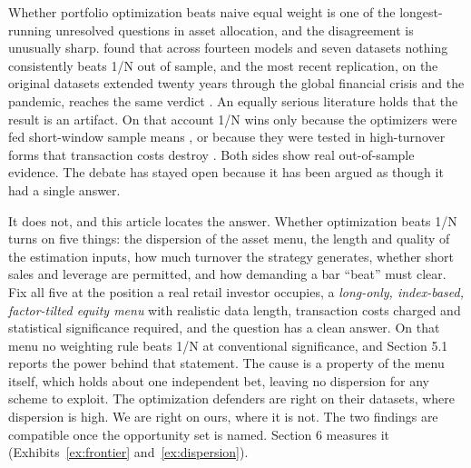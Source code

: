 \documentclass[12pt,letterpaper]{article}
\begin{document}
\clearpage


Whether portfolio optimization beats naive equal weight is one of the
longest-running unresolved questions in asset allocation, and the disagreement
is unusually sharp. \citet{demiguel2009} found that across fourteen models and
seven datasets nothing consistently beats 1/N out of sample, and the most recent
replication, on the original datasets extended twenty years through the global
financial crisis and the pandemic, reaches the same verdict
\citep{gelmini2024}. An equally serious literature holds that the result is an
artifact. On that account 1/N wins only because the optimizers were fed
short-window sample means \citep{kritzman2010}, or because they were tested in
high-turnover forms that transaction costs destroy \citep{kirby2012}. Both sides
show real out-of-sample evidence. The debate has stayed open because it has been
argued as though it had a single answer.

It does not, and this article locates the answer. Whether optimization beats 1/N
turns on five things: the dispersion of the asset menu, the length and quality of
the estimation inputs, how much turnover the strategy generates, whether short
sales and leverage are permitted, and how demanding a bar ``beat'' must clear.
Fix all five at the position a real retail investor occupies, a \emph{long-only, index-based, factor-tilted equity menu} with realistic data length, transaction
costs charged and statistical significance required, and the question has a clean answer. On that menu no weighting rule beats 1/N at
conventional significance, and Section 5.1 reports the power behind that statement. The cause is a property of the menu
itself, which holds about one independent bet, leaving no dispersion for any
scheme to exploit. The optimization defenders are right on their datasets, where
dispersion is high. We are right on ours, where it is not. The two findings are
compatible once the opportunity set is named. Section 6 measures it
(Exhibits~\ref{ex:frontier} and~\ref{ex:dispersion}).
\end{document}
